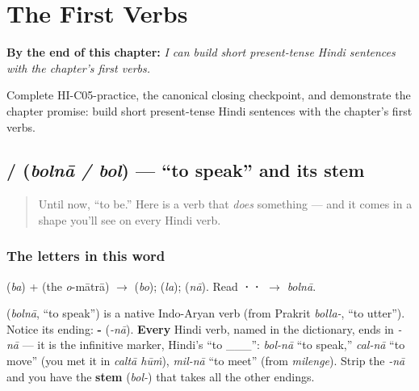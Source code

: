 
\chapter{The First Verbs}
\label{ch:first-verbs}

\begin{chapteropening}
\textbf{By the end of this chapter:} \emph{I can build short present-tense Hindi sentences with the chapter's first verbs.}

Complete HI-C05-practice, the canonical closing checkpoint, and demonstrate the chapter promise: build short present-tense Hindi sentences with the chapter's first verbs.
\end{chapteropening}

\section[\texorpdfstring{\hi{बोलना} / \hi{बोल} (bolnā / bol)}{बोलना / बोल (bolnā / bol)}]{ /  (\emph{bolnā / bol}) — \textquotedblleft{}to speak\textquotedblright{} and its stem}

\label{lesson:HI-C05-bolna}



\begin{quote}
Until now, \textquotedblleft{}to be.\textquotedblright{} Here is a verb that \emph{does} something — and it comes in a shape you'll see on every Hindi verb.
\end{quote}

\subsection*{The letters in this word}
\textbf{} (\emph{ba}) + \textbf{} (the \emph{o}-mātrā) $\to$ \textbf{} (\emph{bo}); \textbf{} (\emph{la}); \textbf{} (\emph{nā}). Read \textbf{··} $\to$ \emph{bolnā}.

\begin{cousinweb}
\textbf{} (\emph{bolnā}, \textquotedblleft{}to speak\textquotedblright{}) is a native Indo-Aryan verb (from Prakrit \emph{bolla-}, \textquotedblleft{}to utter\textquotedblright{}). Notice its ending: \textbf{-} (\emph{-nā}). \textbf{Every} Hindi verb, named in the dictionary, ends in \emph{-nā} — it is the infinitive marker, Hindi's \textquotedblleft{}to \_\_\_\textquotedblright{}: \emph{bol-nā} \textquotedblleft{}to speak,\textquotedblright{} \emph{cal-nā} \textquotedblleft{}to move\textquotedblright{} (you met it in \emph{caltā hūṁ}), \emph{mil-nā} \textquotedblleft{}to meet\textquotedblright{} (from \emph{milenge}). Strip the \emph{-nā} and you have the \textbf{stem} (\emph{bol-}) that takes all the other endings.
\end{cousinweb}

